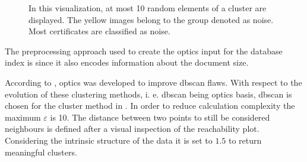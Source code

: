 \begin{figure}[!htb]
    \caption[\ac{optics} clusters]{In this visualization, at most 10 random elements of a cluster are displayed.
    The yellow images belong to the group denoted as noise.
    Most certificates are classified as noise.
    }%
    \label{fig:optics_content_cluster}%
\end{figure}


The preprocessing approach used to create the \ac{optics} input for the \databaseName{} database index is \eigendocs{} 
since it also encodes information about the document size. 

According to \citeauthor{OPTICS2014}, \ac{optics} was developed to improve \ac{dbscan} flaws.
With respect to the evolution of these clustering methods, i. e. \ac{dbscan} being \ac{optics} basis, 
\ac{dbscan} is chosen for the cluster method in .
In order to reduce calculation complexity the maximum $\varepsilon$ is 10.
The distance between two points to still be considered neighbours is defined after a visual inspection of the reachability plot.
Considering the intrinsic structure of the \eigendocs{} data it is set to $1.5$ to return meaningful clusters.
